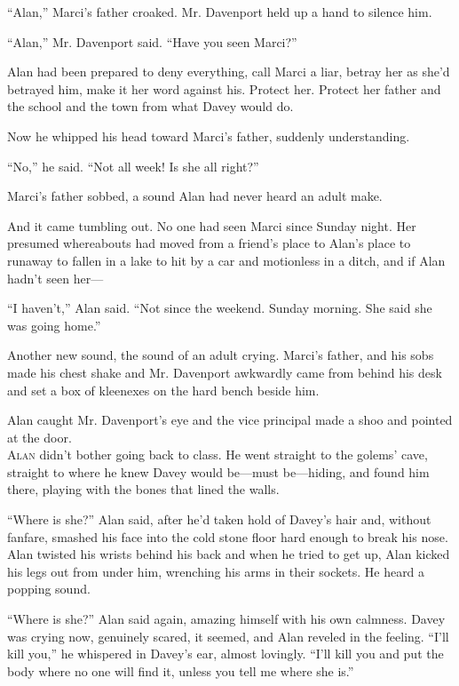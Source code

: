 \documentclass{article}
\begin{document}
``Alan,'' Marci's father croaked.  Mr.  Davenport held up a hand to
silence him.

``Alan,'' Mr.  Davenport said.  ``Have you seen Marci?''

Alan had been prepared to deny everything, call Marci a liar, betray
her as she'd betrayed him, make it her word against his.  Protect her. 
Protect her father and the school and the town from what Davey would
do.

Now he whipped his head toward Marci's father, suddenly understanding.

``No,'' he said.  ``Not all week!  Is she all right?''

Marci's father sobbed, a sound Alan had never heard an adult make.

And it came tumbling out.  No one had seen Marci since Sunday night. 
Her presumed whereabouts had moved from a friend's place to Alan's
place to runaway to fallen in a lake to hit by a car and motionless in
a ditch, and if Alan hadn't seen her---

``I haven't,'' Alan said.  ``Not since the weekend.  Sunday morning. 
She said she was going home.''

Another new sound, the sound of an adult crying.  Marci's father, and
his sobs made his chest shake and Mr.  Davenport awkwardly came from
behind his desk and set a box of kleenexes on the hard bench beside
him.

Alan caught Mr.  Davenport's eye and the vice principal made a shoo
and pointed at the door.
\\
\lettrine[lines=3, lhang=.5, nindent=0pt, findent=2pt]{A}{lan} didn't bother going back to class.  He went straight to the
golems' cave, straight to where he knew Davey would be---must
be---hiding, and found him there, playing with the bones that lined
the walls.

``Where is she?'' Alan said, after he'd taken hold of Davey's hair
and, without fanfare, smashed his face into the cold stone floor hard
enough to break his nose.  Alan twisted his wrists behind his back and
when he tried to get up, Alan kicked his legs out from under him,
wrenching his arms in their sockets.  He heard a popping sound.

``Where is she?'' Alan said again, amazing himself with his own
calmness.  Davey was crying now, genuinely scared, it seemed, and Alan
reveled in the feeling.  ``I'll kill you,'' he whispered in Davey's
ear, almost lovingly.  ``I'll kill you and put the body where no one
will find it, unless you tell me where she is.''
\end{document}
